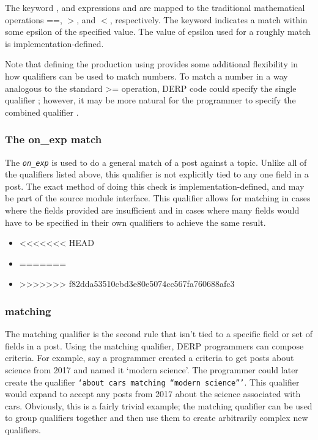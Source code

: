 The keyword , and expressions  and  are mapped to the traditional mathematical operations ==, $>$, and $<$, respectively.
The keyword  indicates a match within some epsilon of the specified value. The value of epsilon used for a roughly match is implementation-defined.

Note that defining the  production using  provides some additional flexibility in how qualifiers can be used to match numbers. To match a
number in a way analogous to the standard >= operation, DERP code could specify the single qualifier ; however, it may be more natural
for the programmer to specify the combined qualifier .

\subsubsection{The on\_exp match}\label{onexp}
The \texttt{\textit{on\_exp}} is used to do a general match of a post against a topic. Unlike all of the qualifiers listed above, this qualifier is not explicitly
tied to any one field in a post. The exact method of doing this check is implementation-defined, and may be part of the source module interface. This qualifier
allows for matching in cases where the fields provided are insufficient and in cases where many fields would have to be specified in their own qualifiers to achieve
the same result.

\begin{itemize}[leftmargin=2in]
    \item[\nonterminal{qualifier}] \bnf{:} 
<<<<<<< HEAD
    \item[\nonterminal{on\_exp}] \bnf{:}  \bnf{|} 
=======
    \item[\nonterminal{on\_exp}] \bnf{:}  \bnf{(} \bnf{|} \bnf{)}
>>>>>>> f82dda53510cbd3e80e5074cc567fa760688afc3
\end{itemize}

\subsubsection{matching}
The matching qualifier is the second rule that isn’t tied to a specific field or set of fields in a post. Using the matching qualifier, DERP programmers can compose criteria.
For example, say a programmer created a criteria to get posts about science from 2017 and named it ‘modern science’. The programmer could later create the qualifier \texttt{‘about cars matching “modern science”’}.
This qualifier would expand to accept any posts from 2017 about the science associated with cars. Obviously, this is a fairly trivial example; the matching qualifier can be
used to group qualifiers together and then use them to create arbitrarily complex new qualifiers.


